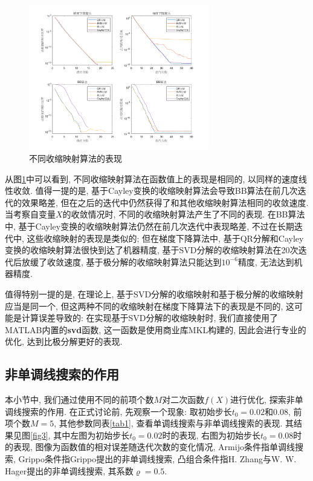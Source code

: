 \documentclass[UTF8]{ctexart}
\begin{document}
\begin{figure}[htb]
    \centering
    \includegraphics[width=0.7\textwidth]{Q2-figure/2.png}
    \caption{不同收缩映射算法的表现}\label{fig2}
\end{figure}

从图\ref{fig2}中可以看到, 不同收缩映射算法在函数值上的表现是相同的, 以同样的速度线性收敛. 值得一提的是, 基于Cayley变换的收缩映射算法会导致BB算法在前几次迭代的效果略差, 但在之后的迭代中仍然获得了和其他收缩映射算法相同的收敛速度. 当考察自变量$X$的收敛情况时, 不同的收缩映射算法产生了不同的表现. 在BB算法中, 基于Cayley变换的收缩映射算法仍然在前几次迭代中表现略差, 不过在长期迭代中, 这些收缩映射的表现是类似的; 但在梯度下降算法中, 基于QR分解和Cayley变换的收缩映射算法很快到达了机器精度, 基于SVD分解的收缩映射算法在20次迭代后放缓了收敛速度, 基于极分解的收缩映射算法只能达到$10^{-6}$精度, 无法达到机器精度. 

值得特别一提的是, 在理论上, 基于SVD分解的收缩映射和基于极分解的收缩映射应当是同一个, 但这两种不同的收缩映射在梯度下降算法下的表现是不同的, 这可能是计算误差导致的: 在实现基于SVD分解的收缩映射时, 我们直接使用了MATLAB内置的\textbf{svd}函数, 这一函数是使用商业库MKL构建的, 因此会进行专业的优化, 达到比极分解更好的表现. 

\subsection{非单调线搜索的作用}
本小节中, 我们通过使用不同的前项个数$M$对二次函数$f(X)$进行优化, 探索非单调线搜索的作用. 在正式讨论前, 先观察一个现象: 取初始步长$t_0=0.02$和$0.08$, 前项个数$M=5$, 其他参数同表\ref{tab1}, 查看单调线搜索与非单调线搜索的表现. 其结果见图\ref{fig3}, 其中左图为初始步长$t_0=0.02$时的表现, 右图为初始步长$t_0=0.08$时的表现, 图像为函数值的相对误差随迭代次数的变化情况, Armijo条件指单调线搜索, Grippo条件指Grippo提出的非单调线搜索, 凸组合条件指H. Zhang与W. W. Hager提出的非单调线搜索, 其系数$\varrho=0.5$. 
\end{document}

